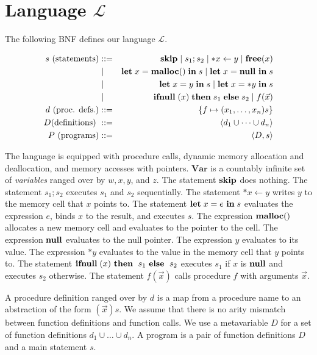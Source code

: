 
\section{Language \(\mathcal{L}\)}

The following BNF defines our language \(\mathcal{L}\).

\begin{eqnarray*}
  s \mbox{ (statements)} & ::= &  \mathbf{skip} \mid s_{1};s_{2} \mid *x \leftarrow y \mid \mathbf{free}(x) \\
  & \mid & \mathbf{let}\; x = \mathbf{malloc()}\; \mathbf{in}\; s \mid \mathbf{let}\; x = \mathbf{null}\ \mathbf{in}\; s  \\
  & \mid & \mathbf{let}\; x = y \; \mathbf{in}\; s \mid   \mathbf{let}\; x = *y \; \mathbf{in}\; s \\
  & \mid & \mathbf{ifnull}\;(x) \; \mathbf{then}\; s_{1}\; \mathbf{else}\; s_{2} \mid f(\vec{x})\\
  d \mbox{ (proc. defs.)} & ::= & \{f \mapsto (x_1,\dots,x_n)s\}\\
  D \mbox{(definitions) } &::=& \langle d_1 \cup \dots \cup d_n \rangle\\
  P \mbox{ (programs)} &::=& \langle D, s \rangle\\
\end{eqnarray*}

The language is equipped with procedure calls, dynamic memory
allocation and deallocation, and memory accesses with pointers.
\(\mathbf{Var}\) is a countably infinite set of \emph{variables}
ranged over by \(w, x, y\), and \(z\).  The statement \(\mathbf{skip}\) does
nothing.  The statement \(s_1;s_2\) executes \(s_1\) and \(s_2\)
sequentially.  The statement \(*x \leftarrow y\) writes \(y\) to the
memory cell that \(x\) points to.  The statement \(\mathbf{let}\; x = e\ \mathbf{in}\; s\)
evaluates the expression \(e\), binds \(x\) to the result, and
executes \(s\).  The expression \(\mathbf{malloc}()\) allocates a new memory
cell and evaluates to the pointer to the cell.  The expression
\(\mathbf{null}\) evaluates to the null pointer.  The expression \(y\)
evaluates to its value.  The expression \(*y\) evaluates to the value
in the memory cell that \(y\) points to.  The statement
\(\IFNULL(x)\ \THEN\ s_1\ \ELSE\ s_2\) executes \(s_1\) if \(x\) is
\(\mathbf{null}\) and executes \(s_2\) otherwise.  The statement
\(f(\vec{x})\) calls procedure \(f\) with arguments \(\vec{x}\).

A procedure definition ranged over by \(d\) is a map from a procedure
name to an abstraction of the form \((\vec{x})s\).  We assume that
there is no arity mismatch between function definitions and function
calls.  We use a metavariable \(D\) for a set of function definitions
\(d_1 \cup \dots \cup d_n\).  A program is a pair of function
definitions \(D\) and a main statement \(s\).


